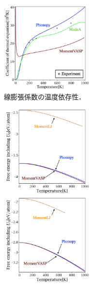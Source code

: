 \documentclass[10pt,twocolumn,a4j]{jsarticle}
\begin{document}
\begin{figure}[htb]
\begin{minipage}{0.245\hsize}
\begin{center}
\includegraphics[width=4.7cm]{./image_result/Al_TEcoeff_label.eps}
\end{center}
\end{minipage}
 \caption{線膨張係数の温度依存性．}
\end{figure}

\begin{figure}[htb]
\begin{minipage}{0.245\hsize}
\begin{center}
\includegraphics[width=4.7cm]{./image_result/Cu_free_u0_label.eps}
\end{center}
\end{minipage}
\begin{minipage}{0.245\hsize}
\begin{center}
\includegraphics[width=4.7cm]{./image_result/Ag_free_u0_label.eps}
\end{center}
\end{minipage}
 \begin{minipage}{0.245\hsize}
\begin{center}

\end{center}
\end{minipage}
\end{figure}
\end{document}
